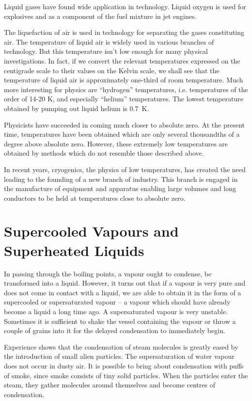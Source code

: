 Liquid gases have found wide application in technology. Liquid oxygen is used for explosives and as a component of the fuel mixture in jet engines.

The liquefaction of air is used in technology for sepa­rating the gases constituting air.
The temperature of liquid air is widely used in various branches of technology. But this temperature isn’t low enough for many physical investigations. In fact, if we convert the relevant temperatures expressed on the cen­tigrade scale to their values on the Kelvin scale, we shall see that the temperature of liquid air is approximately one-third of room temperature. Much more interesting for physics are ``hydrogen'' temperatures, i.e. temperatures of the order of 14-20 \si{\kelvin}, and especially ``helium'' tem­peratures. The lowest temperature obtained by pumping out liquid helium is \SI{0.7}{\kelvin}.

Physicists have succeeded in coming much closer to absolute zero. At the present time, temperatures have been obtained which are only several thousandths of a degree above absolute zero. However, these extremely low temperatures are obtained by methods which do not resemble those described above.

In recent years, cryogenics, the physics of low tem­peratures, has created the need leading to the founding of a new branch of industry. This branch is engaged in the manufacture of equipment and apparatus enabling large volumes and long conductors to be held at temperatures close to absolute zero.

\section{Supercooled Vapours and Superheated Liquids}

In passing through the boiling points, a vapour ought to condense, be transformed into a liquid. However, it turns out that if a vapour is very pure and does not come in contact with a liquid, we are able to obtain it in the form of a supercooled or supersaturated vapour -- a vapour which should have already become a liquid a long time ago.
A supersaturated vapour is very unstable. Sometimes it is sufficient to shake the vessel containing the vapour or throw a couple of grains into it for the delayed con­densation to immediately begin.

Experience shows that the condensation of steam mole­cules is greatly eased by the introduction of small alien particles. The supersaturation of water vapour does not occur in dusty air. It is possible to bring about conden­sation with puffs of smoke, since smoke consists of tiny solid particles. When the particles enter the steam, they gather molecules around themselves and become centres of condensation.

